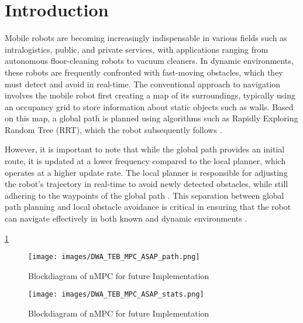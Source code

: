 \documentclass[conference]{IEEEtran}
\begin{document}
\section{Introduction}

Mobile robots are becoming increasingly indispensable in various fields such as intralogistics, public, and private services, with applications ranging from autonomous floor-cleaning robots to vacuum cleaners. In dynamic environments, these robots are frequently confronted with fast-moving obstacles, which they must detect and avoid in real-time. The conventional approach to navigation involves the mobile robot first creating a map of its surroundings, typically using an occupancy grid to store information about static objects such as walls. Based on this map, a global path is planned using algorithms such as Rapidly Exploring Random Tree (RRT), which the robot subsequently follows \cite{thrun2005probabilistic}.

However, it is important to note that while the global path provides an initial route, it is updated at a lower frequency compared to the local planner, which operates at a higher update rate. The local planner is responsible for adjusting the robot's trajectory in real-time to avoid newly detected obstacles, while still adhering to the waypoints of the global path \cite{siegwart2011autonomous}. This separation between global path planning and local obstacle avoidance is critical in ensuring that the robot can navigate effectively in both known and dynamic environments \cite{khatib1986real}.


\cite{ASAP}

\ref{fig:DWA_TEB_MPC_ASAP_path}

\begin{figure}[!h]
    \centering
    \texttt{[image: images/DWA\_TEB\_MPC\_ASAP\_path.png]}
    \caption{Blockdiagram of nMPC for future Implementation }
    \label{fig:DWA_TEB_MPC_ASAP_path}
\end{figure}

\begin{figure}[!h]
    \centering
    \texttt{[image: images/DWA\_TEB\_MPC\_ASAP\_stats.png]}
    \caption{Blockdiagram of nMPC for future Implementation }
    \label{fig:DWA_TEB_MPC_ASAP_stats}
\end{figure}
\end{document}

